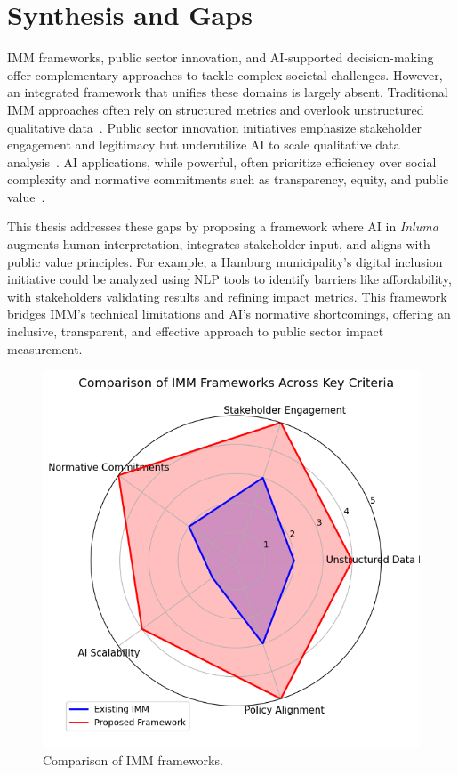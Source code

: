 \section{Synthesis and Gaps}\label{sec:synthesis-gaps}
IMM frameworks, public sector innovation, and AI-supported decision-making offer complementary approaches to tackle complex societal challenges.
However, an integrated framework that unifies these domains is largely absent.
Traditional IMM approaches often rely on structured metrics and overlook unstructured qualitative data~\parencite{epstein_yuthas_2014,fraunhofer_2023}.
Public sector innovation initiatives emphasize stakeholder engagement and legitimacy but underutilize AI to scale qualitative data analysis~\parencite{citylab_2024}.
AI applications, while powerful, often prioritize efficiency over social complexity and normative commitments such as transparency, equity, and public value~\parencite{moore_1995,benington_moore_2011,eu_2024}.

This thesis addresses these gaps by proposing a framework where AI in \textit{Inluma} augments human interpretation, integrates stakeholder input, and aligns with public value principles.
For example, a Hamburg municipality's digital inclusion initiative could be analyzed using NLP tools to identify barriers like affordability, with stakeholders validating results and refining impact metrics.
This framework bridges IMM’s technical limitations and AI’s normative shortcomings, offering an inclusive, transparent, and effective approach to public sector impact measurement.

\begin{figure}[H]
    \centering
    \includegraphics[width=0.8\linewidth]{../fig/imm_comparison}
    \caption{Comparison of IMM frameworks.}
    \label{fig:comparison_imm_fw}
\end{figure}

